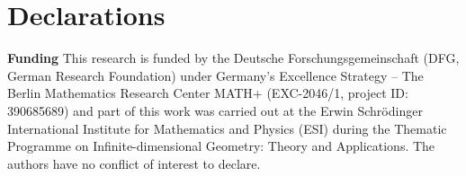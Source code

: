 \documentclass[pdflatex,sn-mathphys-num]{sn-jnl}%
\theoremstyle{thmstyleone}%
\theoremstyle{thmstyletwo}%
\theoremstyle{thmstylethree}%
\begin{document}


\backmatter








\section*{Declarations}


\textbf{Funding}
This research is funded by the Deutsche Forschungsgemeinschaft (DFG, German Research Foundation) under Germany's Excellence Strategy – The Berlin Mathematics Research Center MATH+ (EXC-2046/1, project ID: 390685689) and part of this work was carried out at the Erwin Schrödinger International Institute for Mathematics and Physics (ESI) during the Thematic Programme on Infinite-dimensional Geometry: Theory and Applications. The authors have no conflict of interest to declare.
\end{document}

